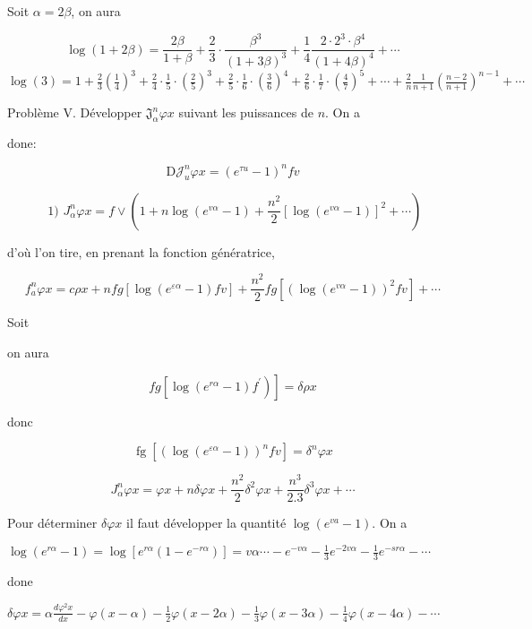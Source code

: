 \documentclass{article}
\begin{document}
Soit \(\alpha=2 \beta\), on aura

\[
\log (1+2 \beta)=\frac{2 \beta}{1+\beta}+\frac{2}{3} \cdot \frac{\beta^{3}}{(1+3 \beta)^{3}}+\frac{1}{4} \frac{2 \cdot 2^{3} \cdot \beta^{4}}{(1+4 \beta)^{4}}+\cdots
\]
\(\log (3)=1+\frac{2}{3}\left(\frac{1}{4}\right)^{3}+\frac{2}{4} \cdot \frac{1}{5} \cdot\left(\frac{2}{5}\right)^{3}+\frac{2}{5} \cdot \frac{1}{6} \cdot\left(\frac{3}{6}\right)^{4}+\frac{2}{6} \cdot \frac{1}{7} \cdot\left(\frac{4}{7}\right)^{5}+\cdots+\frac{2}{n} \frac{1}{n+1}\left(\frac{n-2}{n+1}\right)^{n-1}+\cdots\)

Problème V. Développer \(\mathfrak{J}_{\alpha}^{n} \varphi x\) suivant les puissances de \(n\). On a

done:

\[
\mathrm{D} \mathcal{J}_{u}^{n} \varphi x=\left(e^{\tau u}-1\right)^{n} f v
\]

\[
\text { 1) } J_{\alpha}^{n} \varphi x=f \vee\left(1+n \log \left(e^{v \alpha}-1\right)+\frac{n^{2}}{2}\left[\log \left(e^{v \alpha}-1\right)\right]^{2}+\cdots\right)
\]

d'où l'on tire, en prenant la fonction génératrice,

\[
f_{a}^{n} \varphi x=c \rho x+n f g\left[\log \left(e^{\varepsilon \alpha}-1\right) f v\right]+\frac{n^{2}}{2} f g\left[\left(\log \left(e^{v \alpha}-1\right)\right)^{2} f v\right]+\cdots
\]

Soit

on aura

\[
\left.f g\left[\log \left(e^{r \alpha}-1\right) f^{\prime}\right)\right]=\delta \rho x
\]

donc

\[
\operatorname{fg}\left[\left(\log \left(e^{\varepsilon \alpha}-1\right)\right)^{n} f v\right]=\delta^{n} \varphi x
\]

\[
J_{\alpha}^{n} \varphi x=\varphi x+n \delta \varphi x+\frac{n^{2}}{2} \delta^{2} \varphi x+\frac{n^{3}}{2.3} \delta^{3} \varphi x+\cdots
\]

Pour déterminer \(\delta \varphi x\) il faut développer la quantité \(\log \left(e^{v a}-1\right)\). On a

\(\log \left(e^{r \alpha}-1\right)=\log \left[e^{r \alpha}\left(1-e^{-r \alpha}\right)\right]=v \alpha \cdots-e^{-v \alpha}-\frac{1}{3} e^{-2 v \alpha}-\frac{1}{3} e^{-s r \alpha}-\cdots\)

done

\(\delta \varphi x=\alpha \frac{d \varphi^{2} x}{d x}-\varphi(x-\alpha)-\frac{1}{2} \varphi(x-2 \alpha)-\frac{1}{3} \varphi(x-3 \alpha)-\frac{1}{4} \varphi(x-4 \alpha)-\cdots\)
\end{document}
